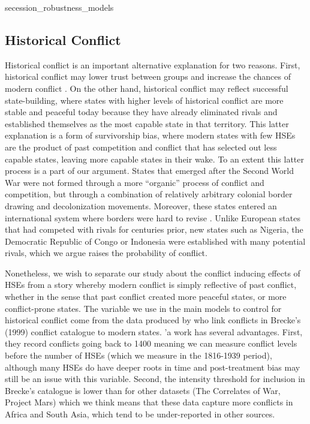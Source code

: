 {secession_robustness_models}

\clearpage   
 
\subsection{Historical Conflict}

Historical conflict is an important alternative explanation for two reasons.
First, historical conflict may lower trust between groups and increase the
chances of modern conflict \citep{Besley2014}. On the other hand, historical
conflict may reflect successful state-building, where states with higher levels
of historical conflict are more stable and peaceful today because they have
already eliminated rivals and established themselves as the most capable state
in that territory. This latter explanation is a form of survivorship bias, where
modern states with few HSEs are the product of past competition and conflict
that has selected out less capable states, leaving more capable states in their
wake. To an extent this latter process is a part of our argument. States that
emerged after the Second World War were not formed through a more ``organic''
process of conflict and competition, but through a combination of relatively
arbitrary colonial border drawing and decolonization movements. Moreover, these
states entered an international system where borders were hard to revise
\citep{Herbst2014}. Unlike European states that had competed with rivals for
centuries prior, new states such as Nigeria, the Democratic Republic of Congo or
Indonesia were established with many potential rivals, which we argue raises the
probability of conflict. 

Nonetheless, we wish to separate our study about the conflict inducing effects
of HSEs from a story whereby modern conflict is simply reflective of past
conflict, whether in the sense that past conflict created more peaceful states,
or more conflict-prone states. The variable we use in the main models to control
for historical conflict come from the data produced by \citet{Dincecco2019} who
link conflicts in Brecke's (1999) conflict catalogue to modern states.
\citet{Dincecco2019}'a work has several advantages. First, they record conflicts
going back to 1400 meaning we can measure conflict levels before the number of
HSEs (which we measure in the 1816-1939 period), although many HSEs do have
deeper roots in time and post-treatment bias may still be an issue with this
variable. Second, the intensity threshold for inclusion in Brecke's catalogue is
lower than for other datasets (The Correlates of War, Project Mars) which we
think means that these data capture more conflicts in Africa and South Asia,
which tend to be under-reported in other sources. 

